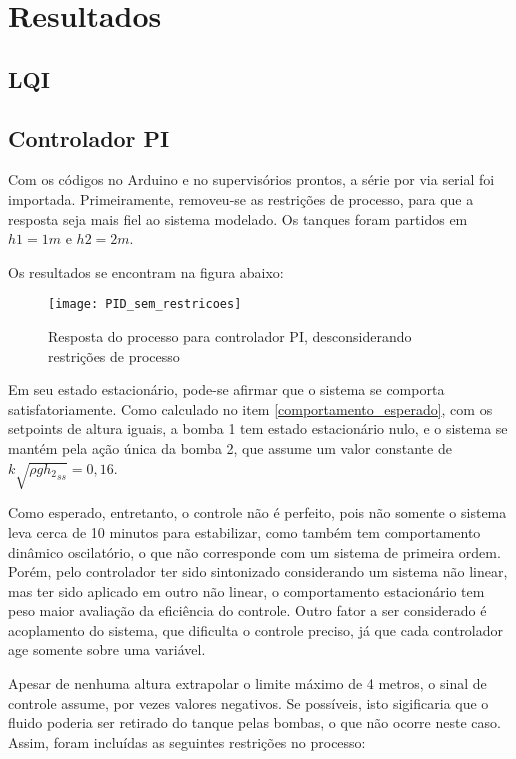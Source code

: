 \section{Resultados}

\subsection{LQI}

\subsection{Controlador PI}

Com os códigos no Arduino e no supervisórios prontos, a série por via serial foi importada. Primeiramente, removeu-se as restrições de processo, para que a resposta seja mais fiel ao sistema modelado. Os tanques foram partidos em $h1 = 1m$ e $h2 = 2m$.

Os resultados se encontram na figura abaixo:

\begin{figure}[H]
	\centering
	\texttt{[image: PID\_sem\_restricoes]}
	\caption{Resposta do processo para controlador PI, desconsiderando restrições de processo}
	\label{img_pid_sem_restricoes}
\end{figure}

Em seu estado estacionário, pode-se afirmar que o sistema se comporta satisfatoriamente. Como calculado no item \ref{comportamento_esperado}, com os setpoints de altura iguais, a bomba 1 tem estado estacionário nulo, e o sistema se mantém pela ação única da bomba 2, que assume um valor constante de $k \sqrt{\rho g{h_2}_{ss}} = 0,16$.

Como esperado, entretanto, o controle não é perfeito, pois não somente o sistema leva cerca de 10 minutos para estabilizar, como também tem comportamento dinâmico oscilatório, o que não corresponde com um sistema de primeira ordem. Porém, pelo controlador ter sido sintonizado considerando um sistema não linear, mas ter sido aplicado em outro não linear, o comportamento estacionário tem peso maior avaliação da eficiência do controle. Outro fator a ser considerado é acoplamento do sistema, que dificulta o controle preciso, já que cada controlador age somente sobre uma variável.

Apesar de nenhuma altura extrapolar o limite máximo de 4 metros, o sinal de controle assume, por vezes valores negativos. Se possíveis, isto sigificaria que o fluido poderia ser retirado do tanque pelas bombas, o que não ocorre neste caso. Assim, foram incluídas as seguintes restrições no processo:

